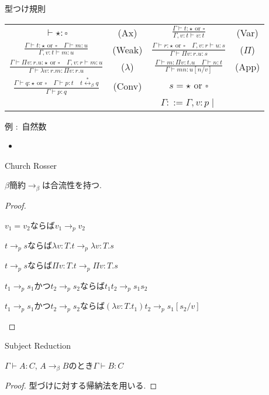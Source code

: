 \documentclass[18pt]{beamer}
\begin{document}
\begin{frame}[fragile]{型つけ規則}
\begin{tabular}{cccc}
 $\vdash {\star} {\colon} {\square}$ & (Ax) & $\frac{\Gamma \vdash t {\colon} {\star} \text{ or } {\square}}{\Gamma, v \colon t \vdash v {\colon} t}$ & (Var) \\[30pt]
 $\frac{\Gamma \vdash t {\colon} {\star} \text{ or } \square \quad \Gamma \vdash m {\colon} u}{\Gamma, v \colon t \vdash m {\colon} u}$ & (Weak) & $\frac{\Gamma \vdash r {\colon} {\star} \text{ or } {\square} \quad \Gamma, v \colon r \vdash u {\colon} s}{\Gamma \vdash \Pi v \colon r. u {\colon} s}$ & ($\Pi$) \\[30pt]
 $\frac{\Gamma \vdash \Pi v \colon r. u {\colon} {\star} \text{ or } {\square} \quad \Gamma, v \colon r \vdash m : u}{\Gamma \vdash \lambda v \colon r. m {\colon} \Pi v \colon r. u}$ & ($\lambda$) & $\frac{\Gamma \vdash m : \Pi v \colon t. u \quad \Gamma \vdash n : t}{\Gamma \vdash m n {\colon} u[n/v]}$ & (App) \\[30pt]
 $\frac{\Gamma \vdash q {\colon} {\star} \text{ or } {\square} \quad \Gamma \vdash p {\colon} t \quad t \overset{*}{\leftrightarrow}_\beta q}{\Gamma \vdash p {\colon} q}$ & (Conv) & $s = {\star} \text{ or } {\square}$ & \\[30pt]
& & $\Gamma ::= \Gamma, v \colon p \mid$ & \\
\end{tabular}
\end{frame}

\begin{frame}{例 $\colon$ 自然数}
 \begin{itemize}
  \item 
 \end{itemize}
\end{frame}

\begin{frame}{Church Rosser}
\begin{thm}
 $\beta$簡約$\rightarrow_{\beta}$は合流性を持つ.
\end{thm}
\begin{proof}
 \begin{description}
  \item $v_1 = v_2$ならば$v_1 \rightarrow_{p} v_2$
  \item $t \rightarrow_{p} s$ならば$\lambda v \colon T. t \rightarrow_{p} \lambda v \colon T. s$
  \item $t \rightarrow_{p} s$ならば$\Pi v \colon T. t \rightarrow_{p} \Pi v \colon T. s$
  \item $t_1 \rightarrow_{p} s_1$かつ$t_2 \rightarrow_{p} s_2$ならば$t_1 t_2 \rightarrow_{p} s_1 s_2$
  \item $t_1 \rightarrow_{p} s_1$かつ$t_2 \rightarrow_{p} s_2$ならば$(\lambda v \colon T. t_1) t_2 \rightarrow_{p} s_1[s_2/v]$
 \end{description}
\end{proof}
\end{frame}

\begin{frame}{Subject Reduction}
\begin{thm}
 $\Gamma \vdash A \colon C$, $A \rightarrow_\beta B$のとき$\Gamma \vdash B \colon C$
\end{thm}
\begin{proof}
 型づけに対する帰納法を用いる.
\end{proof}
\end{frame}
\end{document}
